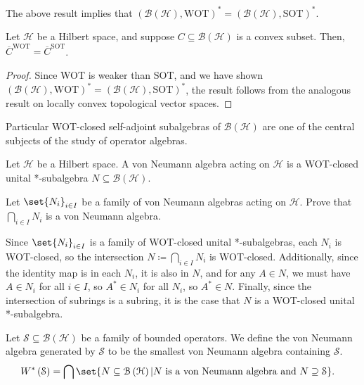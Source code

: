 \documentclass[10pt]{mypackage}
\begin{document}
\begin{remark}
  The above result implies that $\left(\mathcal{B}\left(\mathcal{H}\right),\text{WOT}\right)^{\ast} = \left(\mathcal{B}\left(\mathcal{H}\right),\text{SOT}\right)^{\ast}$.
\end{remark}

\begin{corollary}
  Let $\mathcal{H}$ be a Hilbert space, and suppose $C\subseteq \mathcal{B}\left(\mathcal{H}\right)$ is a convex subset. Then, $\overline{C}^{\text{WOT}} = \overline{C}^{\text{SOT}}$.
\end{corollary}
\begin{proof}
  Since WOT is weaker than SOT, and we have shown $\left(\mathcal{B}\left(\mathcal{H}\right),\text{WOT}\right)^{\ast} = \left(\mathcal{B}\left(\mathcal{H}\right),\text{SOT}\right)^{\ast}$, the result follows from the analogous result on locally convex topological vector spaces.
\end{proof}
Particular WOT-closed self-adjoint subalgebras of $\mathcal{B}\left(\mathcal{H}\right)$ are one of the central subjects of the study of operator algebras. 
\begin{definition}
  Let $\mathcal{H}$ be a Hilbert space. A von Neumann algebra acting on $\mathcal{H}$ is a WOT-closed unital *-subalgebra $N\subseteq \mathcal{B}\left(\mathcal{H}\right)$.
\end{definition}
\begin{exercise}
  Let $\set{N_i}_{i\in I}$ be a family of von Neumann algebras acting on $\mathcal{H}$. Prove that $\bigcap_{i\in I}N_i$ is a von Neumann algebra.
\end{exercise}
\begin{solution}
  Since $\set{N_i}_{i\in I}$ is a family of WOT-closed unital *-subalgebras, each $N_i$ is WOT-closed, so the intersection $N \coloneq \bigcap_{i\in I}N_i$ is WOT-closed. Additionally, since the identity map is in each $N_i$, it is also in $N$, and for any $A\in N$, we must have $A\in N_i$ for all $i\in I$, so $A^{\ast}\in N_i$ for all $N_i$, so $A^{\ast}\in N$. Finally, since the intersection of subrings is a subring, it is the case that $N$ is a WOT-closed unital *-subalgebra.
\end{solution}
\begin{example}
  Let $\mathcal{S} \subseteq \mathcal{B}\left(\mathcal{H}\right)$ be a family of bounded operators. We define the von Neumann algebra generated by $\mathcal{S}$ to be the smallest von Neumann algebra containing $\mathcal{S}$.
  \begin{align*}
    W^{\ast}\left(\mathcal{S}\right) &= \bigcap\set{N\subseteq \mathcal{B}\left(\mathcal{H}\right) | N\text{ is a von Neumann algebra and }N\supseteq \mathcal{S}}.
  \end{align*}
\end{example}
\end{document}
